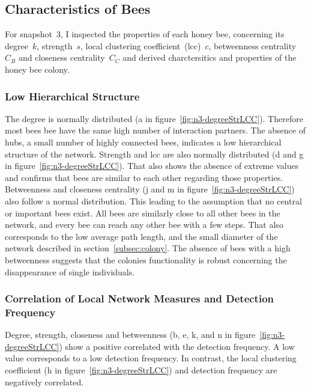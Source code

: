 \subsection{Characteristics of Bees}
\label{subsubsec:bees}
For snapshot~3, I inspected the properties of each honey bee, concerning its degree~$k$, strength~$s$, local clustering coefficient~(lcc)~$c$, betweenness centrality~$C_B$ and closeness centrality~$C_C$ and derived charctersitics and properties of the honey bee colony.

\subsubsection{Low Hierarchical Structure}
The degree is normally distributed (a in figure~\ref{fig:n3-degreeStrLCC}).
Therefore most bees bee have the same high number of interaction partners.
The absence of hubs, a small number of highly connected bees, indicates a low hierarchical structure of the network.
Strength and lcc are also normally distributed (d and g in figure~\ref{fig:n3-degreeStrLCC}).
That also shows the absence of extreme values and confirms that bees are similar to each other regarding those properties.
Betweenness and closeness centrality (j and m in figure~\ref{fig:n3-degreeStrLCC}) also follow a normal distribution.
This leading to the assumption that no central or important bees exist.
All bees are similarly close to all other bees in the network, and every bee can reach any other bee with a few steps.
That also corresponds to the low average path length, and the small diameter of the network described in section~\ref{subsec:colony}.
The absence of bees with a high betweenness suggests that the colonies functionality is robust concerning the disappearance of single individuals.

\subsubsection{Correlation of Local Network Measures and Detection Frequency}
Degree, strength, closeness and betweenness (b, e, k, and n in figure~\ref{fig:n3-degreeStrLCC}) show a positive correlated with the detection frequency. A low value corresponds to a low detection frequency. In contrast, the local clustering coefficient (h in figure~\ref{fig:n3-degreeStrLCC}) and detection frequency are negatively correlated.

